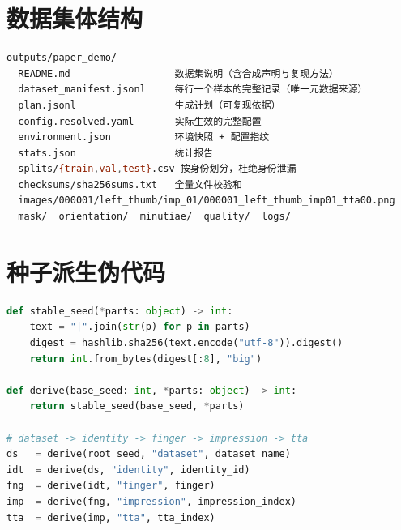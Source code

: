 \documentclass[UTF8, fontset=windows, a4paper, 11pt]{ctexart}
\begin{document}
\section{数据集体结构}

\begin{lstlisting}[language=bash, float=htbp, caption={输出目录结构}, label={lst:layout}]
outputs/paper_demo/
  README.md                  数据集说明（含合成声明与复现方法）
  dataset_manifest.jsonl     每行一个样本的完整记录（唯一元数据来源）
  plan.jsonl                 生成计划（可复现依据）
  config.resolved.yaml       实际生效的完整配置
  environment.json           环境快照 + 配置指纹
  stats.json                 统计报告
  splits/{train,val,test}.csv 按身份划分，杜绝身份泄漏
  checksums/sha256sums.txt   全量文件校验和
  images/000001/left_thumb/imp_01/000001_left_thumb_imp01_tta00.png
  mask/  orientation/  minutiae/  quality/  logs/
\end{lstlisting}

\section{种子派生伪代码}

\begin{lstlisting}[language=Python, float=htbp, caption={层级种子树（SHA-256 派生）}, label={lst:seed}]
def stable_seed(*parts: object) -> int:
    text = "|".join(str(p) for p in parts)
    digest = hashlib.sha256(text.encode("utf-8")).digest()
    return int.from_bytes(digest[:8], "big")

def derive(base_seed: int, *parts: object) -> int:
    return stable_seed(base_seed, *parts)

# dataset -> identity -> finger -> impression -> tta
ds   = derive(root_seed, "dataset", dataset_name)
idt  = derive(ds, "identity", identity_id)
fng  = derive(idt, "finger", finger)
imp  = derive(fng, "impression", impression_index)
tta  = derive(imp, "tta", tta_index)
\end{lstlisting}
\end{document}
